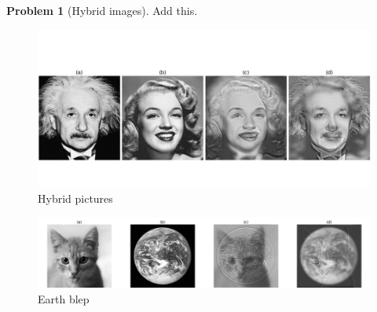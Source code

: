 \documentclass[10pt]{article}
\theoremstyle{plain}
\theoremstyle{definition}
\newtheorem{prob}{Problem}
\numberwithin{equation}{section}
\begin{document}
\hrulefill
\begin{prob}[Hybrid images]
    Add this.
\begin{figure}[p]
    \begin{center}
        \includegraphics[width=\textwidth]{prob5}
        \caption{Hybrid pictures}
    \end{center}
\end{figure}

\begin{figure}[p]
    \begin{center}
        \includegraphics[width=\textwidth]{earthblep}
        \caption{Earth blep}
    \end{center}
\end{figure}
\end{prob}
\end{document}
